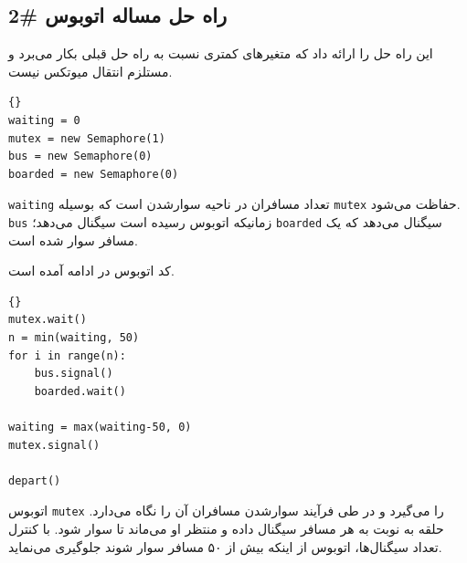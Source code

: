 \documentclass{book}
\begin{document}
\subsection {راه حل مساله اتوبوس \#2}

    
    این راه حل را  ارائه داد که متغیرهای کمتری نسبت به راه حل قبلی بکار می‌برد و  مستلزم انتقال میوتکس نیست. 

\begin{latin}
\begin{lstlisting}[title=\rl{راه حل \#2 مساله اتوبوس  (مقداردهی اولیه)}]{}
waiting = 0
mutex = new Semaphore(1)
bus = new Semaphore(0)
boarded = new Semaphore(0)
\end{lstlisting}
\end{latin}

    {\tt waiting} 
    تعداد مسافران در ناحیه سوارشدن است که بوسیله {\tt mutex} حفاظت می‌شود.  {\tt bus} زمانیکه اتوبوس رسیده است سیگنال می‌دهد؛     {\tt boarded} 
    سیگنال می‌دهد که یک مسافر سوار شده است. 

    کد اتوبوس در ادامه آمده است. 

\begin{latin}
\begin{lstlisting}[title=\rl{راه حل اتوبوس (اتوبوس)}]{}
mutex.wait()
n = min(waiting, 50)
for i in range(n):
    bus.signal()
    boarded.wait()

waiting = max(waiting-50, 0)
mutex.signal()

depart()
\end{lstlisting}
\end{latin}

    اتوبوس {\tt mutex}  را می‌گیرد و در طی فرآیند سوارشدن مسافران آن را نگاه می‌دارد. 
    حلقه به نوبت به هر مسافر  سیگنال داده  و منتظر او می‌ماند تا سوار شود. 
    با کنترل تعداد سیگنال‌ها، اتوبوس از اینکه بیش از ۵۰ مسافر سوار شوند جلوگیری می‌نماید. 
\end{document}
